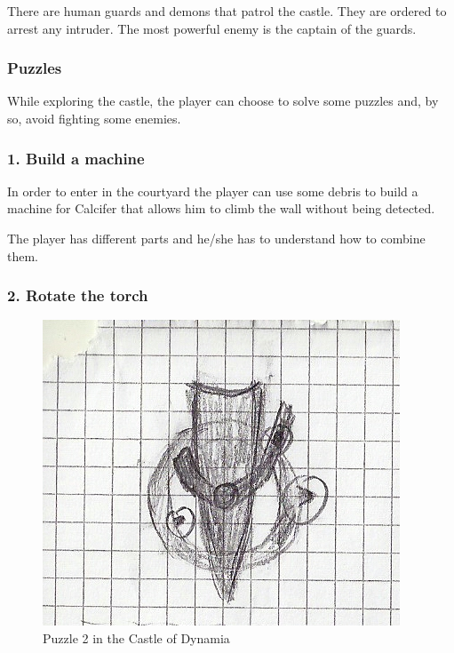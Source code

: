 There are human guards and demons that patrol the castle. They are ordered to arrest any intruder. The most powerful enemy is the captain of the guards.

\subsubsection{Puzzles}
While exploring the castle, the player can choose to solve some puzzles and, by so, avoid fighting some enemies.

\subsubsection*{1. Build a machine}

In order to enter in the courtyard the player can use some debris to build a machine for Calcifer that allows him to climb the wall without being detected.

The player has different parts and he/she has to understand how to combine them.

\subsubsection*{2. Rotate the torch}

\begin{figure}[H]
  \centering
  \includegraphics[width=\textwidth]{Images/Puzzles/castleOfDynamia_2}
  \caption{Puzzle 2 in the Castle of Dynamia}
\end{figure}

